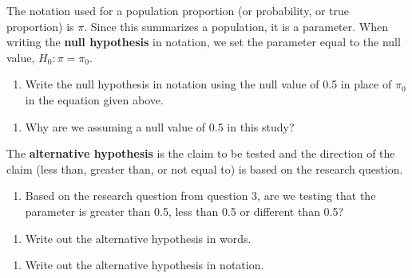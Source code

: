 \documentclass[
]{report}
\providecommand{\tightlist}{%
  \setlength{\itemsep}{0pt}\setlength{\parskip}{0pt}}
\begin{document}
\vspace{0.8in}

The notation used for a population proportion (or probability, or true proportion) is \(\pi\). Since this summarizes a population, it is a parameter. When writing the \textbf{null hypothesis} in notation, we set the parameter equal to the null value, \(H_0: \pi = \pi_0\).

\begin{enumerate}
\def\labelenumi{\arabic{enumi}.}
\setcounter{enumi}{8}
\tightlist
\item
  Write the null hypothesis in notation using the null value of 0.5 in place of \(\pi_0\) in the equation given above.
\end{enumerate}

\vspace{0.5in}

\begin{enumerate}
\def\labelenumi{\arabic{enumi}.}
\setcounter{enumi}{9}
\tightlist
\item
  Why are we assuming a null value of 0.5 in this study?
\end{enumerate}

\newpage

The \textbf{alternative hypothesis} is the claim to be tested and the direction of the claim (less than, greater than, or not equal to) is based on the research question.

\begin{enumerate}
\def\labelenumi{\arabic{enumi}.}
\setcounter{enumi}{10}
\tightlist
\item
  Based on the research question from question 3, are we testing that the parameter is greater than 0.5, less than 0.5 or different than 0.5?
\end{enumerate}

\vspace{0.4in}

\begin{enumerate}
\def\labelenumi{\arabic{enumi}.}
\setcounter{enumi}{11}
\tightlist
\item
  Write out the alternative hypothesis in words.
\end{enumerate}

\vspace{1in}

\begin{enumerate}
\def\labelenumi{\arabic{enumi}.}
\setcounter{enumi}{12}
\tightlist
\item
  Write out the alternative hypothesis in notation.
\end{enumerate}
\end{document}
